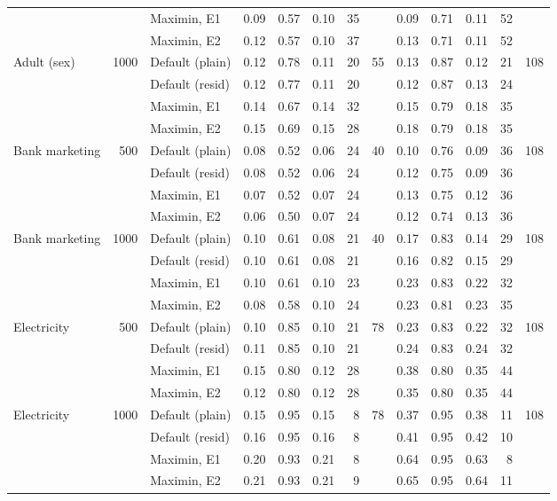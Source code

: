 \documentclass[pdflatex,sn-mathphys-num,iicol]{sn-jnl}
\theoremstyle{thmstyleone}
\theoremstyle{thmstyletwo}
\theoremstyle{thmstylethree}
\begin{document}
\begin{table}[t]
{\begin{tabular}{lrl rr rrr rr rrr}
 &  & Maximin, E1 & 0.09 & 0.57 & 0.10 & 35 &  & 0.09 & 0.71 & 0.11 & 52 &  \\
 &  & Maximin, E2 & 0.12 & 0.57 & 0.10 & 37 &  & 0.13 & 0.71 & 0.11 & 52 &  \\
\addlinespace
Adult (sex) & 1000 & Default (plain) & 0.12 & 0.78 & 0.11 & 20 & 55 & 0.13 & 0.87 & 0.12 & 21 & 108 \\
 &  & Default (resid) & 0.12 & 0.77 & 0.11 & 20 &  & 0.12 & 0.87 & 0.13 & 24 &  \\
 &  & Maximin, E1 & 0.14 & 0.67 & 0.14 & 32 &  & 0.15 & 0.79 & 0.18 & 35 &  \\
 &  & Maximin, E2 & 0.15 & 0.69 & 0.15 & 28 &  & 0.18 & 0.79 & 0.18 & 35 &  \\
\addlinespace
Bank marketing & 500 & Default (plain) & 0.08 & 0.52 & 0.06 & 24 & 40 & 0.10 & 0.76 & 0.09 & 36 & 108 \\
 &  & Default (resid) & 0.08 & 0.52 & 0.06 & 24 &  & 0.12 & 0.75 & 0.09 & 36 &  \\
 &  & Maximin, E1 & 0.07 & 0.52 & 0.07 & 24 &  & 0.13 & 0.75 & 0.12 & 36 &  \\
 &  & Maximin, E2 & 0.06 & 0.50 & 0.07 & 24 &  & 0.12 & 0.74 & 0.13 & 36 &  \\
\addlinespace
Bank marketing & 1000 & Default (plain) & 0.10 & 0.61 & 0.08 & 21 & 40 & 0.17 & 0.83 & 0.14 & 29 & 108 \\
 &  & Default (resid) & 0.10 & 0.61 & 0.08 & 21 &  & 0.16 & 0.82 & 0.15 & 29 &  \\
 &  & Maximin, E1 & 0.10 & 0.61 & 0.10 & 23 &  & 0.23 & 0.83 & 0.22 & 32 &  \\
 &  & Maximin, E2 & 0.08 & 0.58 & 0.10 & 24 &  & 0.23 & 0.81 & 0.23 & 35 &  \\
\addlinespace
Electricity & 500 & Default (plain) & 0.10 & 0.85 & 0.10 & 21 & 78 & 0.23 & 0.83 & 0.22 & 32 & 108 \\
 &  & Default (resid) & 0.11 & 0.85 & 0.10 & 21 &  & 0.24 & 0.83 & 0.24 & 32 &  \\
 &  & Maximin, E1 & 0.15 & 0.80 & 0.12 & 28 &  & 0.38 & 0.80 & 0.35 & 44 &  \\
 &  & Maximin, E2 & 0.12 & 0.80 & 0.12 & 28 &  & 0.35 & 0.80 & 0.35 & 44 &  \\
\addlinespace
Electricity & 1000 & Default (plain) & 0.15 & 0.95 & 0.15 & 8 & 78 & 0.37 & 0.95 & 0.38 & 11 & 108 \\
 &  & Default (resid) & 0.16 & 0.95 & 0.16 & 8 &  & 0.41 & 0.95 & 0.42 & 10 &  \\
 &  & Maximin, E1 & 0.20 & 0.93 & 0.21 & 8 &  & 0.64 & 0.95 & 0.63 & 8 &  \\
 &  & Maximin, E2 & 0.21 & 0.93 & 0.21 & 9 &  & 0.65 & 0.95 & 0.64 & 11 &  \\
\bottomrule\end{tabular}}

\end{table}
\end{document}
